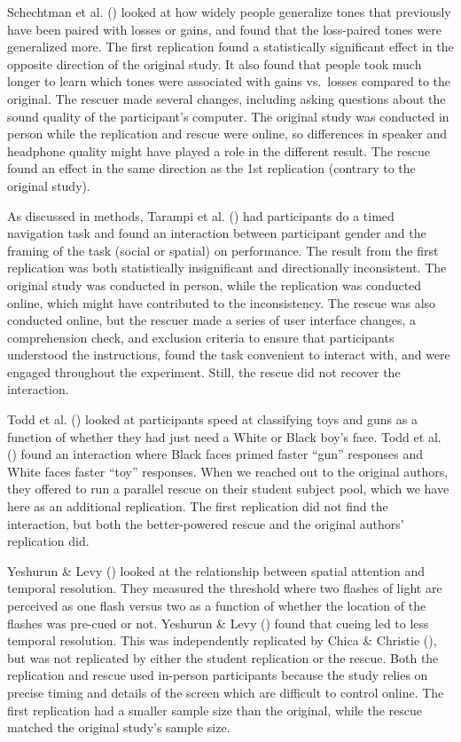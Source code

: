 \documentclass[
  english,
  a4paper,
]{article}
\begin{document}
Schechtman et al. () looked at how widely people generalize tones that previously have been paired with losses or gains, and found that the loss-paired tones were generalized more.
The first replication found a statistically significant effect in the opposite direction of the original study.
It also found that people took much longer to learn which tones were associated with gains vs.~losses compared to the original.
The rescuer made several changes, including asking questions about the sound quality of the participant's computer.
The original study was conducted in person while the replication and rescue were online, so differences in speaker and headphone quality might have played a role in the different result.
The rescue found an effect in the same direction as the 1st replication (contrary to the original study).

As discussed in methods, Tarampi et al. () had participants do a timed navigation task and found an interaction between participant gender and the framing of the task (social or spatial) on performance.
The result from the first replication was both statistically insignificant and directionally inconsistent.
The original study was conducted in person, while the replication was conducted online, which might have contributed to the inconsistency.
The rescue was also conducted online, but the rescuer made a series of user interface changes, a comprehension check, and exclusion criteria to ensure that participants understood the instructions, found the task convenient to interact with, and were engaged throughout the experiment.
Still, the rescue did not recover the interaction.

Todd et al. () looked at participants speed at classifying toys and guns as a function of whether they had just need a White or Black boy's face.
Todd et al. () found an interaction where Black faces primed faster ``gun'' responses and White faces faster ``toy'' responses.
When we reached out to the original authors, they offered to run a parallel rescue on their student subject pool, which we have here as an additional replication.
The first replication did not find the interaction, but both the better-powered rescue and the original authors' replication did.

Yeshurun \& Levy () looked at the relationship between spatial attention and temporal resolution.
They measured the threshold where two flashes of light are perceived as one flash versus two as a function of whether the location of the flashes was pre-cued or not.
Yeshurun \& Levy () found that cueing led to less temporal resolution.
This was independently replicated by Chica \& Christie (), but was not replicated by either the student replication or the rescue.
Both the replication and rescue used in-person participants because the study relies on precise timing and details of the screen which are difficult to control online.
The first replication had a smaller sample size than the original, while the rescue matched the original study's sample size.
\end{document}

